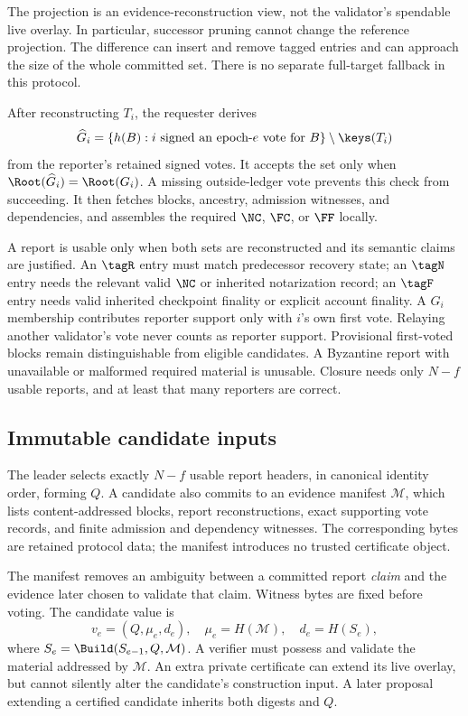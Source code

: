 The projection is an evidence-reconstruction view, not the validator's spendable live overlay. In particular, successor pruning cannot change the reference projection. The difference can insert and remove tagged entries and can approach the size of the whole committed set. There is no separate full-target fallback in this protocol.

After reconstructing $T_i$, the requester derives
\[
\widehat G_i=\{h(B):\text{$i$ signed an epoch-$e$ vote for $B$}\}\setminus\keys(T_i)
\]
from the reporter's retained signed votes. It accepts the set only when $\Root(\widehat G_i)=\Root(G_i)$. A missing outside-ledger vote prevents this check from succeeding. It then fetches blocks, ancestry, admission witnesses, and dependencies, and assembles the required $\NC$, $\FC$, or $\FF$ locally.

A report is usable only when both sets are reconstructed and its semantic claims are justified. An $\tagR$ entry must match predecessor recovery state; an $\tagN$ entry needs the relevant valid $\NC$ or inherited notarization record; an $\tagF$ entry needs valid inherited checkpoint finality or explicit account finality. A $G_i$ membership contributes reporter support only with $i$'s own first vote. Relaying another validator's vote never counts as reporter support. Provisional first-voted blocks remain distinguishable from eligible candidates. A Byzantine report with unavailable or malformed required material is unusable. Closure needs only $N-f$ usable reports, and at least that many reporters are correct.

\subsection{Immutable candidate inputs}
\label{sec:manifest}
The leader selects exactly $N-f$ usable report headers, in canonical identity order, forming $Q$. A candidate also commits to an evidence manifest $\mathcal M$, which lists content-addressed blocks, report reconstructions, exact supporting vote records, and finite admission and dependency witnesses. The corresponding bytes are retained protocol data; the manifest introduces no trusted certificate object.

The manifest removes an ambiguity between a committed report \emph{claim} and the evidence later chosen to validate that claim. Witness bytes are fixed before voting. The candidate value is
\[
v_e=(Q,\mu_e,d_e),\quad \mu_e=H(\mathcal M),\quad d_e=H(S_e),
\]
where $S_e=\Build(S_{e-1},Q,\mathcal M)$. A verifier must possess and validate the material addressed by $\mathcal M$. An extra private certificate can extend its live overlay, but cannot silently alter the candidate's construction input. A later proposal extending a certified candidate inherits both digests and $Q$.


